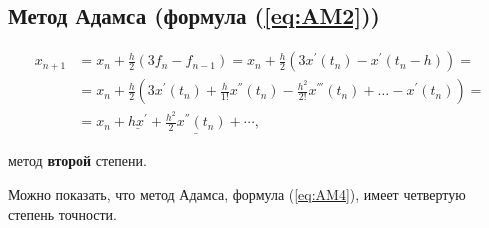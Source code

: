 \documentclass[a4paper,11pt]{article}
\begin{document}
\subsection{Метод Адамса (формула (\ref{eq:AM2}))}
\begin{align*}
x_{n+1} &= x_n + \frac{h}{2}(3f_n - f_{n-1}) = x_n + \frac{h}{2}(3x^{'}(t_n)-x^{'}(t_n-h)) =\\
        &= x_n + \frac{h}{2}(3x^{'}(t_n) + \frac{h}{1!}x^{''}(t_n) - \frac{h^2}{2!}x^{'''}(t_n) + \dots - x^{'}(t_n)) = \\
        &= x_n + \underline{hx^{'}} + \underline{\frac{h^2}{2}x^{''}(t_n)} + \cdots,
\end{align*}
\begin{center}
  \small
  метод \textbf{второй} степени.
\end{center}
Можно показать, что метод Адамса, формула (\ref{eq:AM4}), имеет четвертую степень точности.
\end{document}

